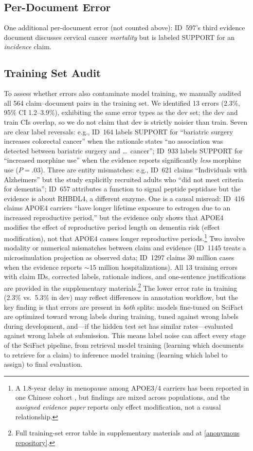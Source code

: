 \documentclass[11pt]{article}
\begin{document}
\subsection{Per-Document Error}

One additional per-document error (not counted above): ID~597's third evidence document discusses cervical cancer \emph{mortality} but is labeled SUPPORT for an \emph{incidence} claim.

\subsection{Training Set Audit}

To assess whether errors also contaminate model training, we manually audited all 564 claim--document pairs in the training set.
We identified 13 errors (2.3\%, 95\% CI 1.2--3.9\%), exhibiting the same error types as the dev set; the dev and train CIs overlap, so we do not claim that dev is strictly noisier than train.
Seven are clear label reversals: e.g., ID~164 labels SUPPORT for ``bariatric surgery increases colorectal cancer'' when the rationale states ``no association was detected between bariatric surgery and \ldots\ cancer''; ID~933 labels SUPPORT for ``increased morphine use'' when the evidence reports significantly \emph{less} morphine use ($P{=}.03$).
Three are entity mismatches: e.g., ID~621 claims ``Individuals with Alzheimers'' but the study explicitly recruited adults who ``did not meet criteria for dementia''; ID~657 attributes a function to signal peptide peptidase but the evidence is about RHBDL4, a different enzyme.
One is a causal misread: ID~416 claims APOE4 carriers ``have longer lifetime exposure to estrogen due to an increased reproductive period,'' but the evidence only shows that APOE4 modifies the effect of reproductive period length on dementia risk (effect modification), not that APOE4 causes longer reproductive periods.\footnote{A 1.8-year delay in menopause among APOE3/4 carriers has been reported in one Chinese cohort \citep{meng2012apoe}, but findings are mixed across populations, and the \emph{assigned evidence paper} reports only effect modification, not a causal relationship.}
Two involve modality or numerical mismatches between claim and evidence (ID~1145 treats a microsimulation projection as observed data; ID~1297 claims 30 million cases when the evidence reports ${\sim}$15 million hospitalizations).
All 13 training errors with claim IDs, corrected labels, rationale indices, and one-sentence justifications are provided in the supplementary materials.\footnote{Full training-set error table in supplementary materials and at \url{[anonymous repository]}.}
The lower error rate in training (2.3\% vs.\ 5.3\% in dev) may reflect differences in annotation workflow, but the key finding is that errors are present in \emph{both} splits: models fine-tuned on SciFact are optimized toward wrong labels during training, tuned against wrong labels during development, and---if the hidden test set has similar rates---evaluated against wrong labels at submission.
This means label noise can affect every stage of the SciFact pipeline, from retrieval model training (learning which documents to retrieve for a claim) to inference model training (learning which label to assign) to final evaluation.
\end{document}
